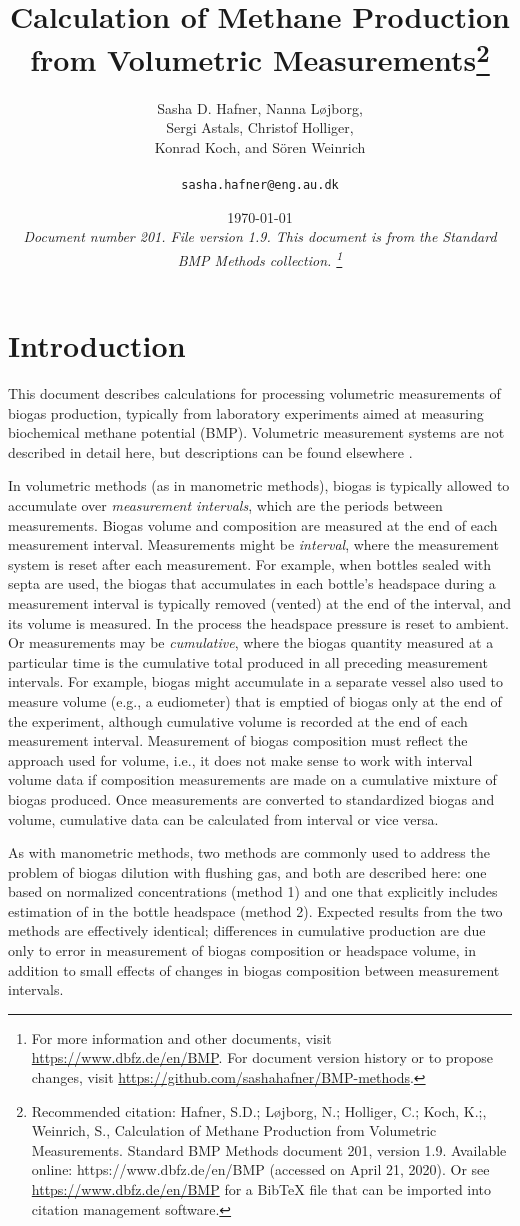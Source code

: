 \documentclass[]{article}
\title {Calculation of Methane Production from Volumetric Measurements\footnote{
  Recommended citation: 
Hafner, S.D.; L{\o}jborg, N.; Holliger, C.; Koch, K.;, Weinrich, S., Calculation of Methane Production from Volumetric Measurements. Standard BMP Methods document 201, version 1.9. Available online: https://www.dbfz.de/en/BMP (accessed on April 21, 2020).
\newline
  Or see \url{https://www.dbfz.de/en/BMP} for a BibTeX file that can be imported into citation management software.
}}
\author{Sasha D. Hafner, Nanna L{\o}jborg, \\ Sergi Astals, Christof Holliger, \\ Konrad Koch, and S{\"o}ren Weinrich\\
\\
\texttt{sasha.hafner@eng.au.dk}
}
\date{\today \\
\bigskip
\textit{
  Document number 201.
  File version 1.9. 
  This document is from the Standard BMP Methods collection.
    \footnote{For more information and other documents, visit \url{https://www.dbfz.de/en/BMP}. 
    For document version history or to propose changes, visit \url{https://github.com/sashahafner/BMP-methods}.}
}
}
\begin{document}
\maketitle

\section{Introduction}
This document describes calculations for processing volumetric measurements of biogas production, typically from laboratory experiments aimed at measuring biochemical methane potential (BMP).
Volumetric measurement systems are not described in detail here, but descriptions can be found elsewhere \citep{owenBioassayMonitoringBiochemical1979,rozziMethodsAssessingMicrobial2004,vdiFermentationOrganicMaterials2016}.

In volumetric methods (as in manometric methods), biogas is typically allowed to accumulate over \textit{measurement intervals}, which are the periods between measurements.
Biogas volume and composition are measured at the end of each measurement interval.
Measurements might be \textit{interval}, where the measurement system is reset after each measurement.
For example, when bottles sealed with septa are used, the biogas that accumulates in each bottle's headspace during a measurement interval is typically removed (vented) at the end of the interval, and its volume is measured. 
In the process the headspace pressure is reset to ambient.
Or measurements may be \textit{cumulative}, where the biogas quantity measured at a particular time is the cumulative total produced in all preceding measurement intervals.
For example, biogas might accumulate in a separate vessel also used to measure volume (e.g., a eudiometer) that is emptied of biogas only at the end of the experiment, although cumulative volume is recorded at the end of each measurement interval.
Measurement of biogas composition must reflect the approach used for volume, i.e., it does not make sense to work with interval volume data if composition measurements are made on a cumulative mixture of biogas produced.
Once measurements are converted to standardized biogas and  volume, cumulative data can be calculated from interval or vice versa.

As with manometric methods, two methods are commonly used to address the problem of biogas dilution with flushing gas, and both are described here: one based on normalized  concentrations (method 1) and one that explicitly includes estimation of  in the bottle headspace (method 2).
Expected results from the two methods are effectively identical; differences in cumulative  production are due only to error in measurement of biogas composition or headspace volume, in addition to small effects of changes in biogas composition between measurement intervals.
\end{document}

